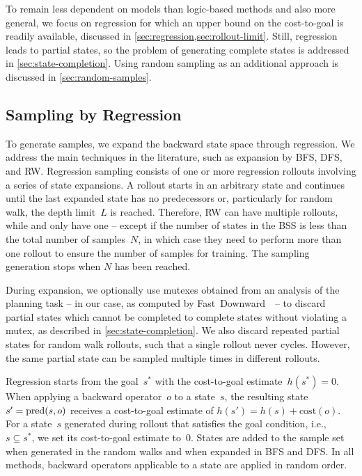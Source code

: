 To remain less dependent on models than logic-based methods and also more general, we focus on regression for which an upper bound on the cost-to-goal is readily available, discussed in \cref{sec:regression,sec:rollout-limit}. Still, regression leads to partial states, so the problem of generating complete states is addressed in \cref{sec:state-completion}. Using random sampling as an additional approach is discussed in \cref{sec:random-samples}.

\subsection{Sampling by Regression}
\label{sec:regression}

To generate samples, we expand the backward state space through regression. We address the main techniques in the literature, such as expansion by BFS, DFS, and RW. Regression sampling consists of one or more regression rollouts involving a series of state expansions. A rollout starts in an arbitrary state and continues until the last expanded state has no predecessors or, particularly for random walk, the depth limit~$L$ is reached. Therefore, RW can have multiple rollouts, while \bfs and \dfs only have one -- except if the number of states in the BSS is less than the total number of samples~$N$, in which case they need to perform more than one rollout to ensure the number of samples for training. The sampling generation stops when $N$ has been reached.

During expansion, we optionally use mutexes obtained from an analysis of the planning task -- in our case, as computed by Fast~Downward~\cite{helmert2006fast}~-- to discard partial states which cannot be completed to complete states without violating a mutex, as described in \cref{sec:state-completion}. We also discard repeated partial states for random walk rollouts, such that a single rollout never cycles. However, the same partial state can be sampled multiple times in different rollouts.

Regression starts from the goal~$s^*$ with the cost-to-goal estimate~$h(s^*)=0$. When applying a backward operator~$o$ to a state~$s$, the resulting state~$s' = \operatorname{pred}(s, o)$ receives a cost-to-goal estimate of $h(s') = h(s) + \text{cost}(o)$. For a state~$s$ generated during rollout that satisfies the goal condition, i.e.,~$s \subseteq s^*$, we set its cost-to-goal estimate to~$0$. States are added to the sample set when generated in the random walks and when expanded in BFS and DFS. In all methods, backward operators applicable to a state are applied in random order.

